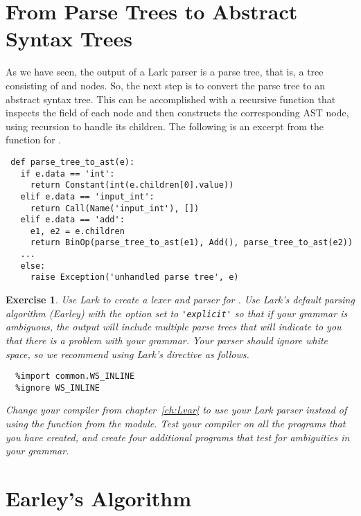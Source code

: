 \documentclass[7x10]{TimesAPriori_MIT}%
\newtheorem{exercise}[theorem]{Exercise}
\numberwithin{theorem}{chapter}
\numberwithin{definition}{chapter}
\numberwithin{equation}{chapter}
\begin{document}
{\section{From Parse Trees to Abstract Syntax Trees}

As we have seen, the output of a Lark parser is a parse tree, that is,
a tree consisting of  and  nodes. So, the next
step is to convert the parse tree to an abstract syntax tree. This can
be accomplished with a recursive function that inspects the
 field of each node and then constructs the corresponding
AST node, using recursion to handle its children. The following is an
excerpt from the  function for \LangInt{}.

\begin{center}
\begin{minipage}{0.95\textwidth}
\begin{lstlisting}
 def parse_tree_to_ast(e):
   if e.data == 'int':
     return Constant(int(e.children[0].value))
   elif e.data == 'input_int':
     return Call(Name('input_int'), [])
   elif e.data == 'add':
     e1, e2 = e.children
     return BinOp(parse_tree_to_ast(e1), Add(), parse_tree_to_ast(e2))
   ...
   else:
     raise Exception('unhandled parse tree', e)
\end{lstlisting}
\end{minipage}
\end{center}

\begin{exercise}
  \normalfont\normalsize
%
  Use Lark to create a lexer and parser for \LangVar{}.  Use Lark's
  default parsing algorithm (Earley) with the  option
  set to \lstinline{'explicit'} so that if your grammar is ambiguous, the
  output will include multiple parse trees that will indicate to you
  that there is a problem with your grammar. Your parser should ignore
  white space, so we recommend using Lark's  directive
  as follows.
\begin{lstlisting}
  %import common.WS_INLINE
  %ignore WS_INLINE
\end{lstlisting}
Change your compiler from chapter~\ref{ch:Lvar} to use your
Lark parser instead of using the  function from
the  module. Test your compiler on all the \LangVar{}
programs that you have created, and create four additional programs
that test for ambiguities in your grammar.
\end{exercise}


\section{Earley's Algorithm}
\label{sec:earley}

}
\end{document}
